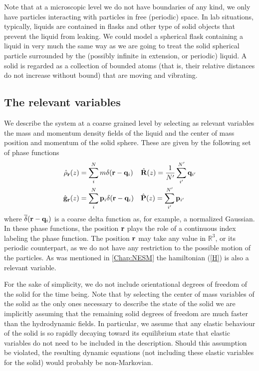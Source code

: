 \documentclass[b5paper,openright,10pt]{book}
\begin{document}
Note that at a microscopic level we do not have boundaries of
  any kind, we only have particles interacting with particles in free
(periodic) space.  In lab  situations, typically, liquids are contained
in flasks and other type of  solid objects that prevent the liquid from
leaking.  We could model a spherical  flask containing a liquid in very
much  the same  way  as we  are  going to  treat  the solid  spherical
particle  surrounded  by  the  (possibly  infinite  in  extension,  or
periodic)  liquid. A solid is
  regarded as a collection of  bounded atoms (that is, their relative
distances  do  not  increase  without   bound)  that  are  moving  and
vibrating. 

\subsection{The relevant variables}
We describe the system at a coarse grained level by selecting as
relevant variables the mass and momentum density fields  of the liquid
and  the   center  of  mass   position  and  momentum  of   the  solid
sphere. These are given by the following set of phase functions 
\begin{align}
  \hat{\rho}_{\bf r}(z) &=\sum^{N}_im\delta({\bf r}-{\bf q}_i)
&&\hat{\bf R}(z)=\frac{1}{N'}\sum_{i'}^{N'}{\bf q}_{i'}
\nonumber\\
  \hat{\bf g}_{\bf r}(z) &=\sum^{N}_i{\bf p}_i\delta({\bf r}-{\bf q}_i)
&&\hat{\bf P}(z)=\sum_{i'}^{N'}{\bf p}_{i'}
\label{CGvar}
\end{align}
where $\overline{\delta}({\bf r}-{\bf q}_i)$ is a coarse delta function as, for example, a normalized Gaussian.
In these phase  functions, the position ${\bf r}$ plays  the role of a
continuous index labeling  the phase function. The  position ${\bf r}$
may take any value in  $\mathbb{R}^3$, or its periodic counterpart, as
we  do  not  have  any  restriction to  the  possible  motion  of  the
particles. As was mentioned in \ref{Chap:NESM} the hamiltonian (\ref{H}) is also a relevant variable.

For the sake of simplicity, we do not include orientational degrees of
freedom of the  solid for the time being.  Note  that by selecting the
center of  mass variables of the  solid as the only  ones necessary to
describe the  state of the solid  we are implicitly assuming  that the
remaining  solid  degrees   of  freedom  are  much   faster  than  the
hydrodynamic  fields.   In  particular,  we assume  that  any  elastic
behaviour of the solid is  so rapidly decaying toward its equilibrium
state  that elastic  variables  do  not need  to  be  included in  the
description. Should this assumption be violated, the resulting dynamic
equations (not including  these elastic variables for the solid)
would probably  be non-Markovian.
\end{document}

